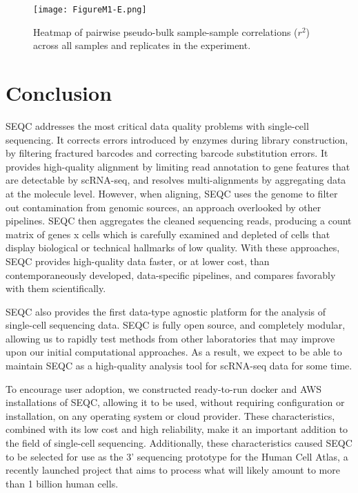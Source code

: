 \begin{figure}
\centering
\texttt{[image: FigureM1-E.png]}
\caption{Heatmap of pairwise pseudo-bulk sample-sample correlations ($r^2$) across all samples
and replicates in the experiment.
}
\label{fig:m1e}
\end{figure}

\section{Conclusion}

SEQC addresses the most critical data quality problems with single-cell sequencing. 
It corrects errors introduced by enzymes during library construction, by filtering fractured barcodes and correcting barcode substitution errors. 
It provides high-quality alignment by limiting read annotation to gene features that are detectable by scRNA-seq, and resolves multi-alignments by aggregating data at the molecule level.  
However, when aligning, SEQC uses the genome to filter out contamination from genomic sources, an approach overlooked by other pipelines. 
SEQC then aggregates the cleaned sequencing reads, producing a count matrix of genes x cells which is carefully examined and depleted of cells that display biological or technical hallmarks of low quality. 
With these approaches, SEQC provides high-quality data faster, or at lower cost, than contemporaneously developed, data-specific pipelines, and compares favorably with them scientifically.  %

SEQC also provides the first data-type agnostic platform for the analysis of single-cell sequencing data.
SEQC is fully open source, and completely modular, allowing us to rapidly test methods from other laboratories that may improve upon our initial computational approaches. 
As a result, we expect to be able to maintain SEQC as a high-quality analysis tool for scRNA-seq data for some time. 

To encourage user adoption, we constructed ready-to-run docker and AWS installations of SEQC, allowing it to be used, without requiring configuration or installation, on any operating system or cloud provider. 
These characteristics, combined with its low cost and high reliability, make it an important addition to the field of single-cell sequencing. 
Additionally, these characteristics caused SEQC to be selected for use as the 3' sequencing prototype for the Human Cell Atlas, a recently launched project that aims to process what will likely amount to more than 1 billion human cells.   

